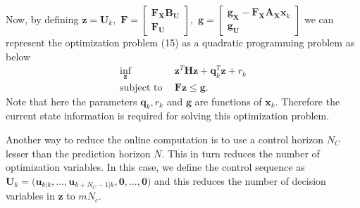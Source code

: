 \documentclass{article}
\begin{document}
Now, by defining $\textbf{z}=\textbf{U}_{k},$ $\textbf{F}=\left[\begin{matrix}\textbf{F}_{\textbf{X}}\textbf{B}_{\textbf{U}}\\ \textbf{F}_{\textbf{U}}\end{matrix}\right],$ $\textbf{g}=\left[\begin{matrix}\textbf{g}_{\textbf{X}}-\textbf{F}_{\textbf{X}}\textbf{A}_{\textbf{X}}\textbf{x}_{k}\\ \textbf{g}_{\textbf{U}}\end{matrix}\right]$ we can represent the optimization problem (15) as a quadratic programming problem as below
\begin{equation}
\begin{aligned}
 \underset{\textbf{z}}{\text{inf}}    ~&~ \textbf{z}^{T}\textbf{H}\textbf{z}+ \textbf{q}_{k}^{T}\textbf{z}+{r}_{k}\\
 \text{subject to}
~&~ \textbf{F}\textbf{z} \leq \textbf{g}.
     \end{aligned}
\end{equation}
Note that here the parameters $\textbf{q}_{k},{r}_{k}$ and $\textbf{g}$ are functions of $\textbf{x}_{k}$. Therefore the current state information is required for solving this optimization problem.
\par Another way to reduce the online computation is to use a control horizon $N_C$ lesser than the prediction horizon $N.$ This in turn reduces the number of optimization variables. In this case, we define the control sequence as
$\textbf{U}_{k} = 
\big(\textbf{u}_{k|k},...,\textbf{u}_{k+{N}_C-1|k},\textbf{0},...,\textbf{0}\big)$ and this reduces the number of decision variables in $\textbf{z}$ to $mN_{c}$.
\newpage
\end{document}
